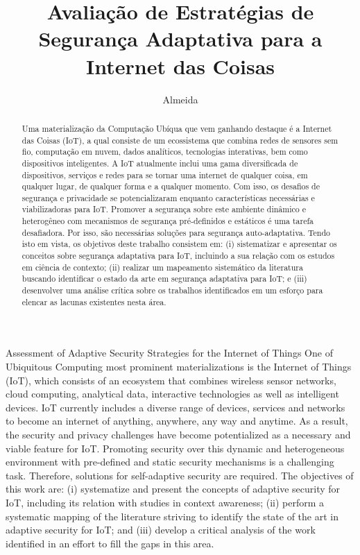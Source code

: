 \documentclass[tid,table]{texufpel} %
\title{Avaliação de Estratégias de Segurança Adaptativa para a Internet das Coisas}
\author{Almeida}{Ricardo Borges}
\begin{document}
\renewcommand{\coadvisorname}{Coorientadora}      %

\maketitle 

\sloppy



\begin{abstract}
Uma materialização da Computação Ubíqua que vem ganhando destaque é a Internet das Coisas (IoT), a qual consiste de um ecossistema que combina redes de sensores sem fio, computação em nuvem, dados analíticos, tecnologias interativas, bem como dispositivos inteligentes. A IoT atualmente inclui uma gama diversificada de dispositivos, serviços e redes para se tornar uma internet de qualquer coisa, em qualquer lugar, de qualquer forma e a qualquer momento. Com isso, os desafios de segurança e privacidade se potencializaram enquanto características necessárias e viabilizadoras para IoT. Promover a segurança sobre este ambiente dinâmico e heterogêneo com mecanismos de segurança pré-definidos e estáticos é uma tarefa desafiadora. Por isso, são necessárias soluções para segurança auto-adaptativa. Tendo isto em vista, os objetivos deste trabalho consistem em: (i) sistematizar e apresentar os conceitos sobre segurança adaptativa para IoT, incluindo a sua relação com os estudos em ciência de contexto; (ii) realizar um mapeamento sistemático da literatura buscando identificar o estado da arte em segurança adaptativa para IoT; e (iii) desenvolver uma análise crítica sobre os trabalhos identificados em um esforço para elencar as lacunas existentes nesta área.
\end{abstract}


\begin{englishabstract}%
  {Assessment of Adaptive Security Strategies for the Internet of Things}
One of Ubiquitous Computing most prominent materializations is the Internet of Things (IoT), which consists of an ecosystem that combines wireless sensor networks, cloud computing, analytical data, interactive technologies as well as intelligent devices. IoT currently includes a diverse range of devices, services and networks to become an internet of anything, anywhere, any way and anytime. As a result, the security and privacy challenges have become potentialized as a necessary and viable feature for IoT. Promoting security over this dynamic and heterogeneous environment with pre-defined and static security mechanisms is a challenging task. Therefore, solutions for self-adaptive security are required. The objectives of this work are: (i) systematize and present the concepts of adaptive security for IoT, including its relation with studies in context awareness; (ii) perform a systematic mapping of the literature striving to identify the state of the art in adaptive security for IoT; and (iii) develop a critical analysis of the work identified in an effort to fill the gaps in this area.
\end{englishabstract}
\end{document}
